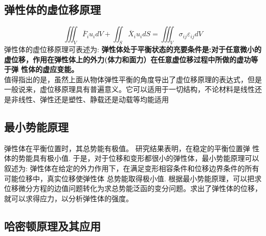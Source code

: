 \documentclass{book}
\begin{document}
\subsection{弹性体的虚位移原理}
\begin{equation}
 \iiint_V \overline{F}_i u_i dV + \iint_S \overline{X}_i u_i dS = \iiint_V \sigma_{ij} \varepsilon_{ij} dV
\end{equation}
弹性体的虚位移原理可表述为:
\textbf{弹性体处于平衡状态的充要条件是:对于任意微小的虚位移，作用在弹性体上的外力(体力和面力）在任意虚位移过程中所做的虚功等于弹
性体的虚应变能。}
\\
值得指出的是，虽然上面从物体弹性平衡的角度导出了虚位移原理的表达式，但是一般说来，虚位移原理具有普遍意义。它可以适用于一切结构，不论材料是线性还是非线性、弹性还是塑性、静载还是动载等均能适用

\subsection{最小势能原理}
弹性体在平衡位置时，其总势能有极值。
研究结果表明，在稳定的平衡位置弹 性体的势能具有极小值.
于是，对于位移和变形都很小的弹性体，最小势能原理可以叙述为:
弹性体在给定的外力作用下，在满足变形相容条件和位移边界条件的所有可能位移中，真实位移使弹性体 总势能取得极小值.
根据最小势能原理，可以把求位移微分方程的边值问题转化为求总势能泛函的变分问题。求出了弹性体的位移，就可以求得应力，以分析弹性体的强度。

\subsection{哈密顿原理及其应用}
\end{document}
